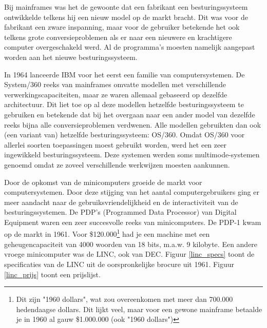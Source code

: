 Bij mainframes was het de gewoonte dat een fabrikant een
besturingssysteem ontwikkelde telkens hij een nieuw model op de markt
bracht. Dit was voor de fabrikant een zware inspanning, maar voor de
gebruiker betekende het ook telkens grote conversieproblemen als er
naar een nieuwere en krachtigere computer overgeschakeld werd. Al de
programma's moesten namelijk aangepast worden aan het nieuwe
besturingssysteem.

In 1964 lanceerde IBM voor het eerst een familie van
computersystemen. De System/360 reeks van mainframes omvatte modellen
met verschillende verwerkingscapaciteiten, maar ze waren allemaal
gebaseerd op dezelfde architectuur. Dit liet toe op al deze modellen
hetzelfde besturingssysteem te gebruiken en betekende dat bij het
overgaan naar een ander model van dezelfde reeks bijna alle
conversieproblemen verdwenen. Alle modellen gebruikten dan ook (een
variant van) hetzelfde besturingssysteem: OS/360. Omdat OS/360 voor
allerlei soorten toepassingen moest gebruikt worden, werd het een zeer
ingewikkeld besturingssysteem. Deze systemen werden soms
multimode-systemen genoemd omdat ze zoveel verschillende werkwijzen
moesten aankunnen.

Door de opkomst van de minicomputers groeide de markt voor
computersystemen. Door deze stijging van het aantal computergebruikers
ging er meer aandacht naar de gebruiksvriendelijkheid en de
interactiviteit van de besturingssystemen. De PDP's (Programmed Data
Processor) van Digital Equipment waren een zeer succesvolle reeks van
minicomputers. De PDP-1 kwam op de markt in 1961. Voor
\$120.000\footnote{Dit zijn "1960 dollars", wat zou overeenkomen
met meer dan 700.000 hedendaagse dollars. Dit lijkt veel, maar voor een gewone
mainframe betaalde je in 1960 al gauw \$1.000.000 (ook "1960 dollars")} had je
een machine met een geheugencapaciteit van 4000 woorden van 18 bits, m.a.w. 9
kilobyte. Een andere vroege minicomputer was de LINC, ook van DEC. Figuur \ref{linc_specs} toont de specificaties van de LINC uit de oorspronkelijke brocure uit 1961. Figuur \ref{linc_prijs} toont een prijslijst.

